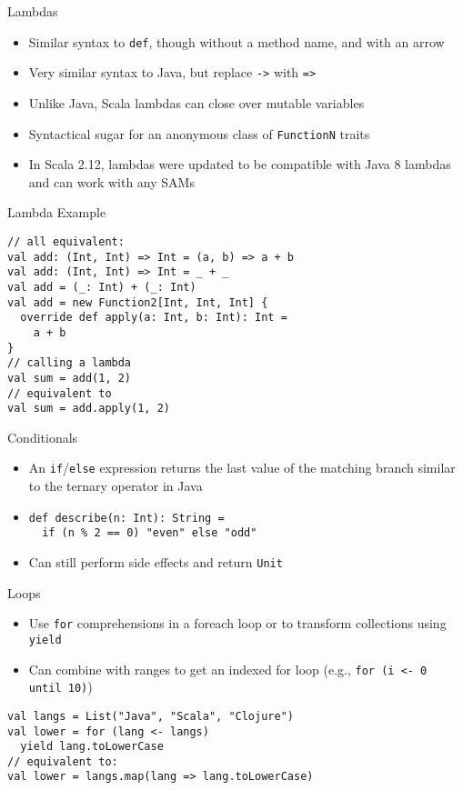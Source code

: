 \documentclass{beamer}
\begin{document}
\begin{frame}[fragile]{Lambdas}
\begin{itemize}
\item Similar syntax to \lstinline{def}, though without a method name, and with an arrow
\item Very similar syntax to Java, but replace \lstinline{->} with \lstinline{=>}
\item Unlike Java, Scala lambdas can close over mutable variables
\item Syntactical sugar for an anonymous class of \lstinline{FunctionN} traits
\item In Scala 2.12, lambdas were updated to be compatible with Java 8 lambdas and can work with any SAMs
\end{itemize}
\end{frame}

\begin{frame}[fragile]{Lambda Example}
\begin{lstlisting}
// all equivalent:
val add: (Int, Int) => Int = (a, b) => a + b
val add: (Int, Int) => Int = _ + _
val add = (_: Int) + (_: Int)
val add = new Function2[Int, Int, Int] {
  override def apply(a: Int, b: Int): Int =
    a + b
}
// calling a lambda
val sum = add(1, 2)
// equivalent to
val sum = add.apply(1, 2)
\end{lstlisting}
\end{frame}

\begin{frame}[fragile]{Conditionals}
\begin{itemize}
\item An \lstinline{if}/\lstinline{else} expression returns the last value of the matching branch similar
to the ternary operator in Java
\item
\begin{lstlisting}
def describe(n: Int): String =
  if (n % 2 == 0) "even" else "odd"
\end{lstlisting}
\item Can still perform side effects and return \lstinline{Unit}
\end{itemize}
\end{frame}

\begin{frame}[fragile]{Loops}
\begin{itemize}
\item Use \lstinline{for} comprehensions in a foreach loop or to transform collections using \lstinline{yield}
\item Can combine with ranges to get an indexed for loop (e.g., \lstinline{for (i <- 0 until 10)})
\end{itemize}
\begin{lstlisting}
val langs = List("Java", "Scala", "Clojure")
val lower = for (lang <- langs)
  yield lang.toLowerCase
// equivalent to:
val lower = langs.map(lang => lang.toLowerCase)
\end{lstlisting}
\end{frame}
\end{document}
